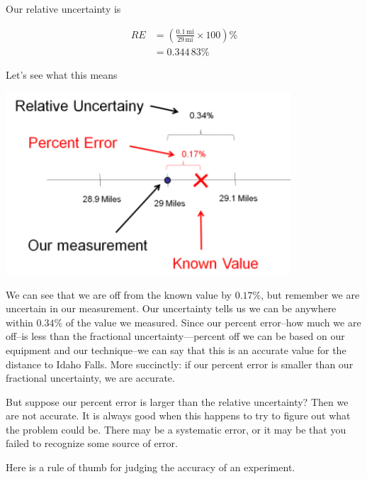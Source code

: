 \documentclass[twoside,11pt,ShortChapTitles]{BYUTextbook}
\begin{document}
Our relative uncertainty is

\begin{align*}
RE  & =\left(  \frac{0.1\,\text{mi} }{29\,\text{mi} }\times100\right)  \%\\
& =\allowbreak0.344\,83\%
\end{align*}

Let's see what this means
\begin{center}
\includegraphics[width=0.8\textwidth]{Lab1_Figs/old_images-009.png}\end{center}
 We can see that we are off from the known value by $0.17\%$, but remember we
are uncertain in our measurement. Our uncertainty tells us we can be anywhere
within $0.34\%$ of the value we measured. Since our percent error--how much we
are off--is less than the fractional uncertainty---percent off we can be based
on our equipment and our technique--we can say that this is an accurate value
for the distance to Idaho Falls. More succinctly: if our percent error is
smaller than our fractional uncertainty, we are accurate.

But suppose our percent error is larger than the relative uncertainty? Then we
are not accurate. It is always good when this happens to try to figure out
what the problem could be. There may be a systematic error, or it may be that
you failed to recognize some source of error.

Here is a rule of thumb for judging the accuracy of an experiment.
\end{document}

